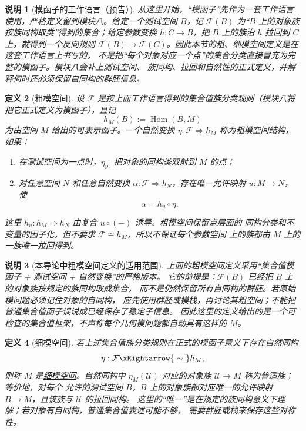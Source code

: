 \documentclass[UTF8,fontset=none,a4paper,11pt]{ctexart}
\theoremstyle{foundation-definition}
\newtheorem{definition}{定义}[section]
\theoremstyle{foundation-theorem}
\theoremstyle{foundation-proposition}
\theoremstyle{foundation-example}
\theoremstyle{foundation-remark}
\newtheorem{remark}[definition]{说明}
\theoremstyle{foundation-theorem}
\newcommand{\term}[2]{\hyperref[#1]{#2}}
\begin{document}
\begin{remark}[模函子的工作语言（预告）]\label{rem:moduli-functor-preview}
从这里开始，“模函子”先作为一套工作语言使用，严格定义留到模块八。给定一个测试空间
\(B\)，记 \(\mathcal F(B)\) 为“\(B\) 上的对象族按族同构取类”得到的集合；给定参数变换
\(h:C\to B\)，把 \(B\) 上的族沿 \(h\) 拉回到 \(C\) 上，就得到一个反向规则
\(\mathcal F(B)\to\mathcal F(C)\)。因此本节的粗、细模空间定义是在这套工作语言上书写的，
不是把“每个对象对应一个点”的集合分类直接冒充为完整的模函子。模块八会补上测试空间、
族同构、拉回和自然性的正式定义，并解释何时还必须保留自同构的群胚信息。
\end{remark}

\begin{definition}[粗模空间]\label{def:coarse-moduli-space}
设 \(\mathcal F\) 是按上面工作语言得到的集合值族分类规则（模块八将把它正式定义为模函子），且记
\[
h_M(B):=\operatorname{Hom}(B,M)
\]
为由空间 \(M\) 给出的可表示函子。一个自然变换
\(\eta:\mathcal F\Rightarrow h_M\) 称为\term{def:coarse-moduli-space}{粗模空间}结构，如果：
\begin{enumerate}[label=(\alph*)]
  \item 在测试空间为一点时，\(\eta_{\mathrm{pt}}\) 把对象的同构类双射到 \(M\) 的点；
  \item 对任意空间 \(N\) 和任意自然变换
  \(\alpha:\mathcal F\Rightarrow h_N\)，存在唯一允许映射
  \(u:M\to N\)，使
  \[
  \alpha=h_u\circ\eta.
  \]
\end{enumerate}
这里 \(h_u:h_M\Rightarrow h_N\) 由复合 \(u\circ(-)\) 诱导。粗模空间保留点层面的
同构分类和不变量的因子化，但不要求 \(\mathcal F\cong h_M\)，所以不保证每个参数空间
上的族都由 \(M\) 上的一族唯一拉回得到。
\end{definition}

\begin{remark}[本导论中粗模空间定义的适用范围]\label{rem:coarse-moduli-scope}
上面的粗模空间定义采用“集合值模函子 + 测试空间 + 自然变换”的严格版本。
它的前提是：\(\mathcal F(B)\) 已经把 \(B\) 上的对象族按规定的族同构取成集合，
而不是仍然保留所有自同构的群胚。若原始模问题必须记住对象的自同构，
应先使用群胚或模栈，再讨论其粗空间；不能把普通集合值函子误说成已经保存了稳定子信息。
因此这里的定义给出的是一个可检查的集合值框架，不声称每个几何模问题都自动具有这样的 \(M\)。
\end{remark}

\begin{definition}[细模空间]\label{def:fine-moduli-space}
若上述集合值族分类规则在正式的模函子意义下存在自然同构
\[
\eta:\mathcal F\xRightarrow{\ \sim\ }h_M,
\]
则称 \(M\) 是\term{def:fine-moduli-space}{细模空间}。自然同构中
\(\eta_M(\mathcal U)\) 对应的对象族 \(\mathcal U\to M\) 称为普适族；等价地，对每个
允许的测试空间 \(B\)，\(B\) 上的对象族都对应唯一的允许映射 \(B\to M\)，且该族与
\(\mathcal U\) 的拉回同构。
这里的“唯一”是在规定的族同构意义下理解；若对象有自同构，普通集合值表述可能不够，
需要群胚或栈来保存这些对称性。
\end{definition}
\end{document}
